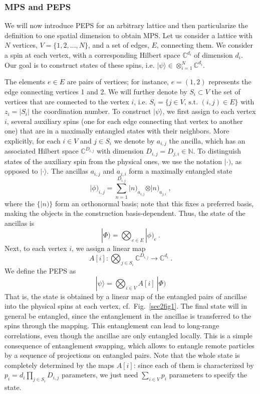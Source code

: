 \documentclass[rmp,aps,reprint,superscriptaddress,nobalancelastpage]{revtex4-1}
\newcommand{\be}{\begin{equation}}
\newcommand{\ee}{\end{equation}}
\newcommand{\ket}[1]{\vert#1\rangle}
\begin{document}
\subsubsection{MPS and PEPS} \label{MPSandPEPS}

We will now introduce PEPS for an arbitrary lattice and then particularize the definition to one spatial dimension to obtain MPS. Let us consider a lattice with $N$ vertices, $V=\{1,2,\ldots,N\}$, and a set of edges, $E$, connecting them. We consider a spin at each vertex, with a corresponding Hilbert space $\mathbb{C}^{d_i}$ of dimension $d_i$. Our goal is to construct states of these spins, i.e. $|\psi\rangle\in \otimes_{i=1}^N \mathbb{C}^{d_i}$.

The elements $e\in E$ are pairs of vertices; for instance, $e=(1,2)$ represents the edge connecting vertices 1 and 2. We will further denote by $S_i\subset V$ the set of vertices that are connected to the vertex $i$, i.e. $S_i=\{j\in V \text{, s.t. } (i,j)\in E\}$ with $z_i=|S_i|$ the coordination number. To construct $\ket\psi$, we first assign to each vertex $i$, several auxiliary spins (one for each edge connecting that vertex to another one) that are in a maximally entangled states with their neighbors. More explicitly, for each $i\in V$ and $j\in S_i$ we denote by $a_{i,j}$ the ancilla, which has an associated Hilbert space $\mathbb{C}^{D_{i,j}}$ with dimension $D_{i,j}=D_{j,i}\in \mathbb{N}$.
To distinguish states of the auxiliary spin from the physical ones, we use the notation $\vert\cdot)$, as opposed to $\vert\cdot\rangle$.
The ancillas $a_{i,j}$ and $a_{j,i}$ form a maximally entangled state
\begin{equation}
    \label{eq:ancilla-state-bipartite}
    |\phi)_{i,j} = \sum_{n=1}^{D_{i,j}} \vert n)_{a_{i,j}}
    \otimes \vert n)_{a_{j,i}}\ ,
\end{equation}
where the $\{|n)\}$ form an orthonormal basis; note that this fixes a preferred basis, making the objects in the construction basis-dependent. Thus, the state of the ancillas is
\begin{equation}
    \label{eq:ancilla-state-Phi}
    |\Phi) = \bigotimes_{e\in E} |\phi)_e\ .
\end{equation}
Next, to each vertex $i$, we assign a linear map
$$
    A[i]: \bigotimes_{j\in S_i} \mathbb{C}^{D_{i,j}}\to \mathbb{C}^{d_{i}}\ .
$$
We define the PEPS as
\be
    |\psi\rangle = \bigotimes_{i\in V} A[i]\: |\Phi)
\ee
That is, the state is obtained by a linear map of the entangled pairs of ancillae into the physical spins at each vertex, cf.\ Fig.~\ref{sec2fig1}. The final state will in general be entangled, since the entanglement in the ancillae is transferred to the spins through the mapping. This entanglement can lead to long-range correlations, even though the ancillae are only entangled locally. This is a simple consequence of entanglement swapping, which allows to entangle remote particles by a sequence of projections on entangled pairs. Note that the whole state is completely determined by the maps $A[i]$: since each of them is characterized by $p_i=d_i \prod_{j\in S_i} D_{i,j}$ parameters, we just need $\sum_{i\in V} p_i$ parameters to specify the state.
\end{document}
